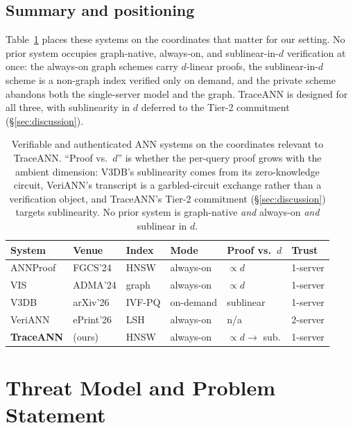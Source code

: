 \documentclass[11pt]{article}
\newcommand{\sys}{TraceANN}
\begin{document}
\subsection{Summary and positioning}

Table~\ref{tab:related} places these systems on the coordinates that
matter for our setting. No prior system occupies graph-native,
always-on, and sublinear-in-$d$ verification at once: the always-on
graph schemes carry $d$-linear proofs, the sublinear-in-$d$ scheme is a
non-graph index verified only on demand, and the private scheme abandons
both the single-server model and the graph. \sys{} is designed for all
three, with sublinearity in $d$ deferred to the Tier-2 commitment
(\S\ref{sec:discussion}).

\begin{table}[t]\centering\footnotesize
\setlength{\tabcolsep}{5pt}
\caption{Verifiable and authenticated ANN systems on the coordinates
relevant to \sys{}. ``Proof vs.\ $d$'' is whether the per-query proof
grows with the ambient dimension: V3DB's sublinearity comes from its
zero-knowledge circuit, VeriANN's transcript is a garbled-circuit
exchange rather than a verification object, and \sys{}'s Tier-2
commitment (\S\ref{sec:discussion}) targets sublinearity. No prior
system is graph-native \emph{and} always-on \emph{and} sublinear in
$d$.}\label{tab:related}
\begin{tabular}{@{}llllll@{}}
\toprule
System & Venue & Index & Mode & Proof vs.\ $d$ & Trust \\
\midrule
ANNProof \cite{annproof2024} & FGCS'24   & HNSW   & always-on & $\propto d$          & 1-server \\
VIS \cite{vis2024}           & ADMA'24   & graph  & always-on & $\propto d$          & 1-server \\
V3DB \cite{v3db2026}         & arXiv'26  & IVF-PQ & on-demand & sublinear           & 1-server \\
VeriANN \cite{veriann2026}   & ePrint'26 & LSH    & always-on & n/a                 & 2-server \\
\midrule
\textbf{\sys{}}              & (ours)    & HNSW   & always-on & $\propto d \to$ sub. & 1-server \\
\bottomrule
\end{tabular}
\end{table}

\section{Threat Model and Problem Statement}\label{sec:model}
\end{document}
